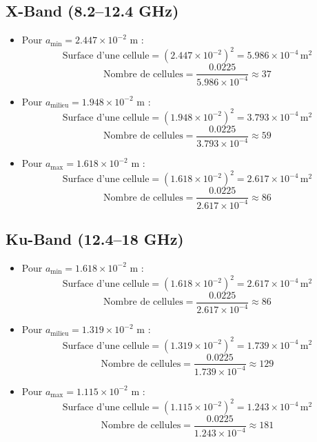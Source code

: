 \documentclass{article}
\begin{document}
\subsection{X-Band (8.2–12.4 GHz)}
\begin{itemize}
    \item Pour \( a_{\text{min}} = 2.447 \times 10^{-2} \) m :
    \[
    \text{Surface d'une cellule} = (2.447 \times 10^{-2})^2 = 5.986 \times 10^{-4} \, \text{m}^2
    \]
    \[
    \text{Nombre de cellules} = \frac{0.0225}{5.986 \times 10^{-4}} \approx 37
    \]

    \item Pour \( a_{\text{milieu}} = 1.948 \times 10^{-2} \) m :
    \[
    \text{Surface d'une cellule} = (1.948 \times 10^{-2})^2 = 3.793 \times 10^{-4} \, \text{m}^2
    \]
    \[
    \text{Nombre de cellules} = \frac{0.0225}{3.793 \times 10^{-4}} \approx 59
    \]

    \item Pour \( a_{\text{max}} = 1.618 \times 10^{-2} \) m :
    \[
    \text{Surface d'une cellule} = (1.618 \times 10^{-2})^2 = 2.617 \times 10^{-4} \, \text{m}^2
    \]
    \[
    \text{Nombre de cellules} = \frac{0.0225}{2.617 \times 10^{-4}} \approx 86
    \]
\end{itemize}

\subsection{Ku-Band (12.4–18 GHz)}
\begin{itemize}
    \item Pour \( a_{\text{min}} = 1.618 \times 10^{-2} \) m :
    \[
    \text{Surface d'une cellule} = (1.618 \times 10^{-2})^2 = 2.617 \times 10^{-4} \, \text{m}^2
    \]
    \[
    \text{Nombre de cellules} = \frac{0.0225}{2.617 \times 10^{-4}} \approx 86
    \]

    \item Pour \( a_{\text{milieu}} = 1.319 \times 10^{-2} \) m :
    \[
    \text{Surface d'une cellule} = (1.319 \times 10^{-2})^2 = 1.739 \times 10^{-4} \, \text{m}^2
    \]
    \[
    \text{Nombre de cellules} = \frac{0.0225}{1.739 \times 10^{-4}} \approx 129
    \]

    \item Pour \( a_{\text{max}} = 1.115 \times 10^{-2} \) m :
    \[
    \text{Surface d'une cellule} = (1.115 \times 10^{-2})^2 = 1.243 \times 10^{-4} \, \text{m}^2
    \]
    \[
    \text{Nombre de cellules} = \frac{0.0225}{1.243 \times 10^{-4}} \approx 181
    \]
\end{itemize}
\end{document}

